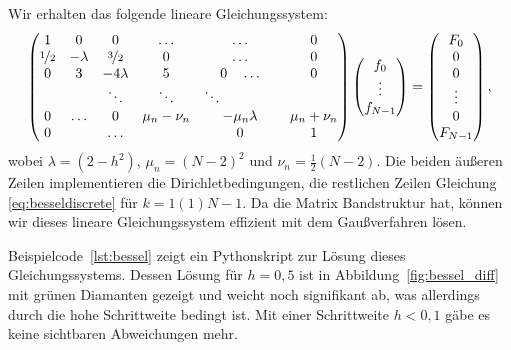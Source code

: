 Wir erhalten das folgende lineare Gleichungssystem:
\begin{equation}
  \begin{pmatrix}
    1 & 0         & 0         &\ldots & \ldots & 0\\
    \nicefrac{1}{2} & -\lambda & \nicefrac{3}{2} & 0 & \ldots & 0\\
    0 & 3         & -4\lambda & 5 & 0\quad \ldots & 0\\
    & & \ddots & \ddots & \ddots\qquad\qquad \\
    0 & \ldots & 0 & \mu_n - \nu_n & -\mu_n\lambda & \mu_n + \nu_n\\
    0 &          &  \ldots  &   & 0      & 1
  \end{pmatrix}
  \begin{pmatrix}
    f_0\\
    \vdots\\
    f_{N-1}
  \end{pmatrix}=
  \begin{pmatrix}
    F_0\\
    0\\
    0\\
    \vdots\\
    0 \\
    F_{N-1}
  \end{pmatrix},
\end{equation}
wobei $\lambda=(2-h^2)$, $\mu_n=(N-2)^2$ und $\nu_n=
\frac{1}{2}(N-2)$. Die beiden äußeren Zeilen implementieren die
Dirichletbedingungen, die restlichen Zeilen Gleichung
\eqref{eq:besseldiscrete} für $k=1(1)N-1$.  Da die Matrix Bandstruktur
hat, können wir dieses lineare Gleichungssystem effizient mit dem
Gaußverfahren lösen.

Beispielcode~\ref{lst:bessel} zeigt ein Pythonskript zur Lösung dieses
Gleichungssystems. Dessen Lösung für $h=0,5$ ist in
Abbildung~\ref{fig:bessel_diff} mit grünen Diamanten gezeigt und
weicht noch signifikant ab, was allerdings durch die hohe Schrittweite
bedingt ist. Mit einer Schrittweite $h < 0,1$ gäbe es keine sichtbaren
Abweichungen mehr.

